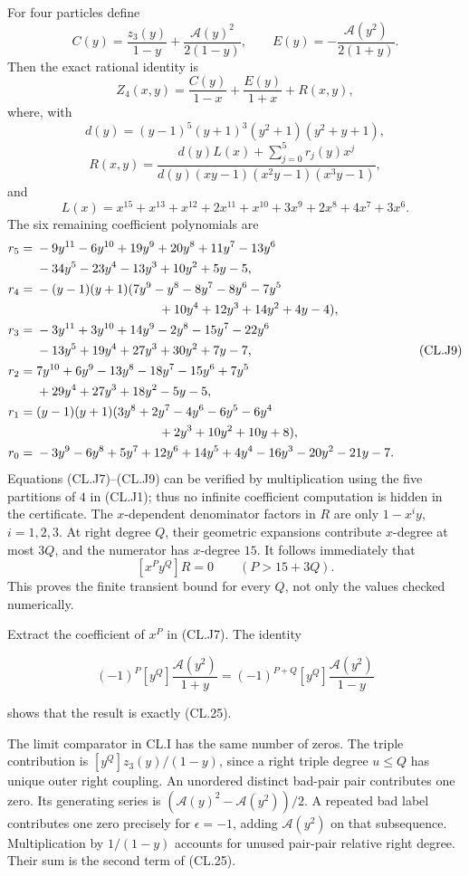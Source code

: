 \documentclass[a4paper,11pt]{article}
\numberwithin{equation}{section}
\begin{document}
For four particles define \[
C(y)=\frac{z_3(y)}{1-y}+\frac{\mathcal A(y)^2}{2(1-y)},
\qquad E(y)=-\frac{\mathcal A(y^2)}{2(1+y)}.
\] Then the exact rational identity is \[
Z_4(x,y)=\frac{C(y)}{1-x}+\frac{E(y)}{1+x}+R(x,y),
\tag{CL.J7}
\] where, with \[
d(y)=(y-1)^5(y+1)^3(y^2+1)(y^2+y+1),
\] \[
R(x,y)=
\frac{d(y)L(x)+\sum_{j=0}^5r_j(y)x^j}
{d(y)(xy-1)(x^2y-1)(x^3y-1)},
\tag{CL.J8}
\] and \[
L(x)=x^{15}+x^{13}+x^{12}+2x^{11}+x^{10}
+3x^9+2x^8+4x^7+3x^6.
\] The six remaining coefficient polynomials are \[
\begin{aligned}
r_5={}&-9y^{11}-6y^{10}+19y^9+20y^8+11y^7-13y^6\\
&-34y^5-23y^4-13y^3+10y^2+5y-5,\\
r_4={}&-(y-1)(y+1)
(7y^9-y^8-8y^7-8y^6-7y^5\\
&\hspace{34mm}+10y^4+12y^3+14y^2+4y-4),\\
r_3={}&-3y^{11}+3y^{10}+14y^9-2y^8-15y^7-22y^6\\
&-13y^5+19y^4+27y^3+30y^2+7y-7,\\
r_2={}&7y^{10}+6y^9-13y^8-18y^7-15y^6+7y^5\\
&+29y^4+27y^3+18y^2-5y-5,\\
r_1={}&(y-1)(y+1)
(3y^8+2y^7-4y^6-6y^5-6y^4\\
&\hspace{34mm}+2y^3+10y^2+10y+8),\\
r_0={}&-3y^9-6y^8+5y^7+12y^6+14y^5+4y^4
-16y^3-20y^2-21y-7.
\end{aligned}
\tag{CL.J9}
\] Equations (CL.J7)--(CL.J9) can be verified by multiplication using the five partitions of \(4\) in (CL.J1); thus no infinite coefficient computation is hidden in the certificate. The \(x\)-dependent denominator factors in \(R\) are only \(1-x^iy\), \(i=1,2,3\). At right degree \(Q\), their geometric expansions contribute \(x\)-degree at most \(3Q\), and the numerator has \(x\)-degree \(15\). It follows immediately that \[
[x^Py^Q]R=0\qquad(P>15+3Q).
\tag{CL.J10}
\] This proves the finite transient bound for every \(Q\), not only the values checked numerically.

Extract the coefficient of \(x^P\) in (CL.J7). The identity

\[(-1)^P[y^Q]\frac{\mathcal A(y^2)}{1+y}
=(-1)^{P+Q}[y^Q]\frac{\mathcal A(y^2)}{1-y}\]

shows that the result is exactly (CL.25).

The limit comparator in CL.I has the same number of zeros. The triple contribution is \([y^Q]z_3(y)/(1-y)\), since a right triple degree \(u\leq Q\) has unique outer right coupling. An unordered distinct bad-pair pair contributes one zero. Its generating series is \((\mathcal A(y)^2-\mathcal A(y^2))/2\). A repeated bad label contributes one zero precisely for \(\epsilon=-1\), adding \(\mathcal A(y^2)\) on that subsequence. Multiplication by \(1/(1-y)\) accounts for unused pair-pair relative right degree. Their sum is the second term of (CL.25).
\end{document}
